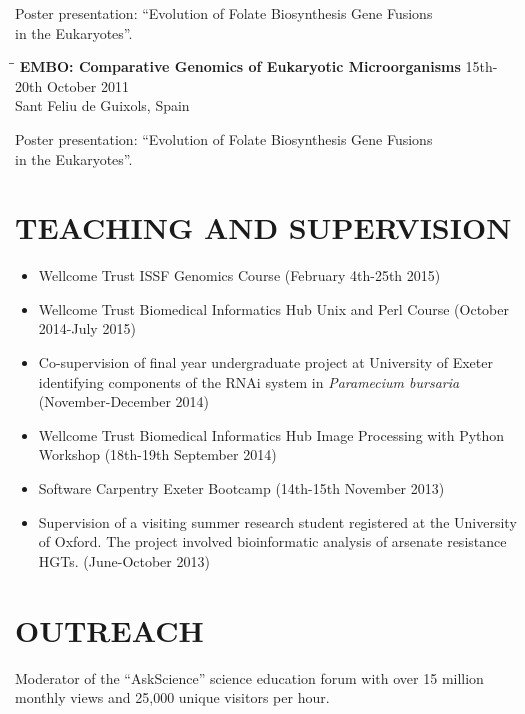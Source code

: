 \documentclass{res}
\begin{document}
\begin{resume}
\begin{tabbing}
   \end{tabbing}\vspace{-20pt}      
      Poster presentation: ``Evolution of Folate Biosynthesis Gene Fusions \\in the Eukaryotes''.
      
  
  \vspace{-0.1in}
     \begin{tabbing} 
   \hspace{2in}\= \hspace{2.6in}\= \kill 
    {\bf EMBO: Comparative Genomics of Eukaryotic Microorganisms}
    \>  \> 15th-20th October 2011\\
                         \>    \> Sant Feliu de Guixols, Spain
   \end{tabbing}\vspace{-20pt}      
      Poster presentation: ``Evolution of Folate Biosynthesis Gene Fusions \\in the Eukaryotes''.

  \section{TEACHING AND SUPERVISION}
  \begin{itemize}
          \vspace{-1pt}
      \item Wellcome Trust ISSF Genomics Course (February 4th-25th 2015)
      \item Wellcome Trust Biomedical Informatics Hub Unix and Perl Course (October 2014-July 2015)
      \item Co-supervision of final year undergraduate project at University of Exeter identifying components of the RNAi system in \textit{Paramecium bursaria} (November-December 2014)
      \item Wellcome Trust Biomedical Informatics Hub Image Processing with Python Workshop (18th-19th September 2014)
      \item Software Carpentry Exeter Bootcamp (14th-15th November 2013)
      \item Supervision of a visiting summer research student registered at the University of Oxford. The project involved bioinformatic analysis of arsenate resistance HGTs. (June-October 2013)
  \end{itemize}

 \section{OUTREACH}          
 \vspace{5pt}
Moderator of the ``AskScience'' science education forum with over 15 million monthly views and 25,000 unique visitors per hour.
\vspace{-5pt}

\end{resume}
\end{document}
